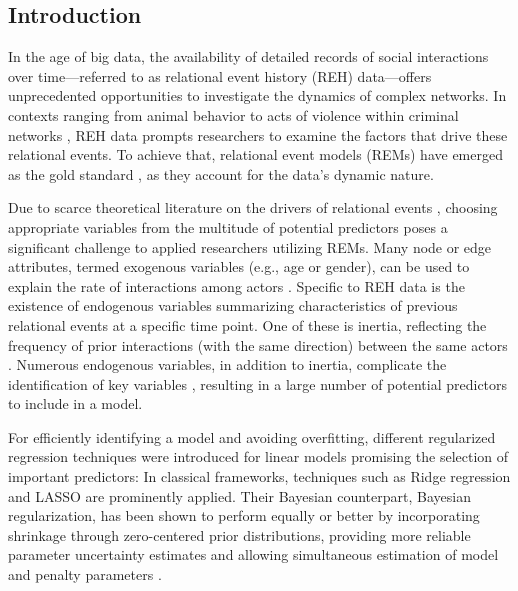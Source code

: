 \documentclass{article}
\begin{document}
\begin{spacing}{2}
\begin{justify}

\section{Introduction}

In the age of big data, the availability of detailed records of social interactions over time—referred to as relational event history (REH) data—offers unprecedented opportunities to investigate the dynamics of complex networks. In contexts ranging from animal behavior \citep{Tranmer2015} to acts of violence within criminal networks \citep{Niezink2022}, REH data prompts researchers to examine the factors that drive these relational events. To achieve that, relational event models (REMs) have emerged as the gold standard \citep{Butts2008}, as they account for the data's dynamic nature.

Due to scarce theoretical literature on the drivers of relational events \citep{Karimova2023}, choosing appropriate variables from the multitude of potential predictors poses a significant challenge to applied researchers utilizing REMs. Many node or edge attributes, termed exogenous variables (e.g., age or gender), can be used to explain the rate of interactions among actors \citep{MeijerinkBosman2022}. Specific to REH data is the existence of endogenous variables summarizing characteristics of previous relational events at a specific time point. One of these is inertia, reflecting the frequency of prior interactions (with the same direction) between the same actors \citep{Leenders2016}. Numerous endogenous variables, in addition to inertia, complicate the identification of key variables \citep{Butts2008}, resulting in a large number of potential predictors to include in a model.

For efficiently identifying a model and avoiding overfitting, different regularized regression techniques were introduced for linear models \citep{Hastie2015} promising the selection of important predictors: In classical frameworks, techniques such as Ridge regression \citep[$\ell_2$ norm;][]{Hoerl1970} and LASSO  \citep[$\ell_1$ norm;][]{Tibshirani1996} are prominently applied. Their Bayesian counterpart, Bayesian regularization, has been shown to perform equally or better by incorporating shrinkage through zero-centered prior distributions, providing more reliable parameter uncertainty estimates and allowing simultaneous estimation of model and penalty parameters \citep{vanErp2019}. \par


\end{justify}
\end{spacing}
\end{document}
